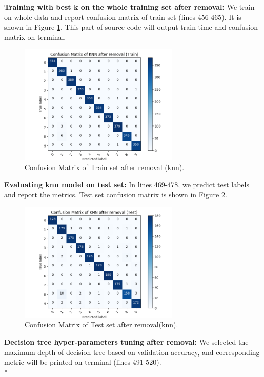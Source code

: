 \documentclass[12pt]{article}
\begin{document}
\textbf{Training with best k on the whole training set after removal:} We train on whole data and report confusion matrix of train set (lines 456-465). It is shown in Figure \ref{fig:reknntrain}. This part of source code will output train time and confusion matrix on terminal.
\begin{figure}[ht] 
	\begin{center}
		\includegraphics[width=3in]{reknntrain.png}
		\caption{Confusion Matrix of Train set after removal (knn).}
		\label{fig:reknntrain}
	\end{center}
\end{figure} 

\textbf{Evaluating knn model on test set:} In lines 469-478, we predict test labels and report the metrics. Test set confusion matrix is shown in Figure \ref{fig:reknntest}.
\begin{figure}[ht] 
	\begin{center}
		\includegraphics[width=3in]{reknntest.png}
		\caption{Confusion Matrix of Test set after removal(knn).}
		\label{fig:reknntest}
	\end{center}
\end{figure} 
\newpage
\textbf{Decision tree hyper-parameters tuning after removal:} We selected the maximum depth of decision tree based on validation accuracy, and corresponding metric will be printed on terminal (lines 491-520).\\*
\end{document}
